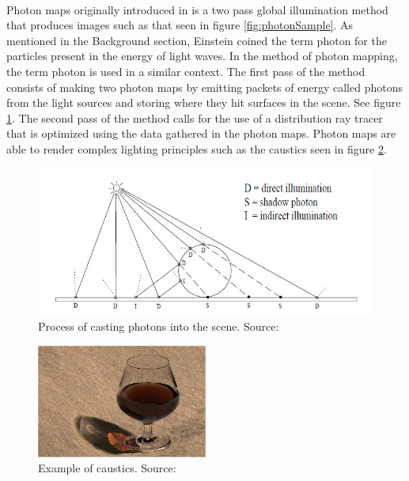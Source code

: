 \paragraph{}
Photon maps originally introduced in \cite{Jensen1996} is a two pass global illumination method that produces images such as that seen in figure \ref{fig:photonSample}.  As mentioned in the Background section, Einstein coined the term photon for the particles present in the energy of light waves.  In the method of photon mapping, the term photon is used in a similar context.  The first pass of the method consists of making two photon maps by emitting packets of energy called photons from the light sources and storing where they hit surfaces in the scene.  See figure \ref{fig:photonCalc}.  The second pass of the method calls for the use of a distribution ray tracer that is optimized using the data gathered in the photon maps.  Photon maps are able to render complex lighting principles such as the caustics seen in figure \ref{fig:photonCaustics}.

\begin{figure}[h!]
  \centering
    \includegraphics[width=1.0\textwidth]{photonCalc.jpg}
  \caption{Process of casting photons into the scene. Source: \protect\cite{Jensen1996}}
	\label{fig:photonCalc}
\end{figure}

\begin{figure}[h!]
  \centering
    \includegraphics[width=0.5\textwidth]{photonCaustics.jpg}
  \caption{Example of caustics. Source: \protect\cite{Jensen1996}}
	\label{fig:photonCaustics}
\end{figure}

